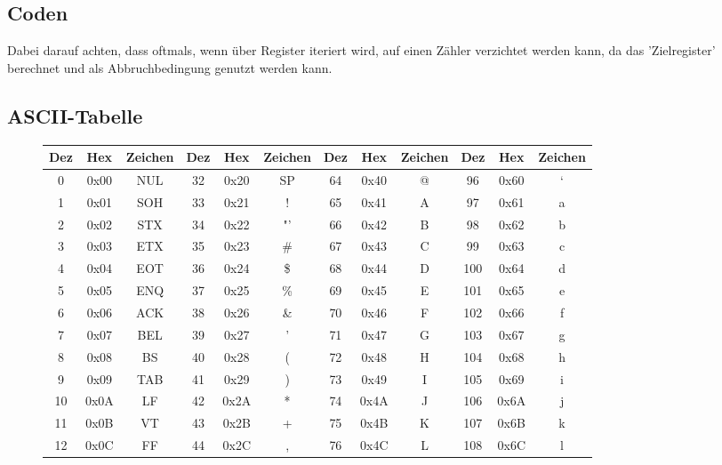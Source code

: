 \documentclass[a4paper]{article}
\begin{document}
	\subsection{Coden}
		Dabei darauf achten, dass oftmals, wenn über Register iteriert wird, auf einen Zähler verzichtet werden kann, da 
		das 'Zielregister' berechnet und als Abbruchbedingung genutzt werden kann.
	\subsection{ASCII-Tabelle}
	
	\begin{figure}[H]
	\begin{longtable}{|c|c|c||c|c|c||c|c|c||c|c|c|}
		\hline
		Dez & Hex  & Zeichen & Dez & Hex  & Zeichen & Dez  & Hex  & Zeichen & Dez & Hex  &  Zeichen   \\
		\hline
		 0  & 0x00 &   NUL   & 32  & 0x20 &   SP    &   64 & 0x40 &    @    & 96  & 0x60 &     `      \\
		 1  & 0x01 &   SOH   & 33  & 0x21 &    !    &	65 & 0x41 &    A    & 97  & 0x61 &     a      \\
		 2  & 0x02 &   STX   & 34  & 0x22 &   "'    &	66 & 0x42 &    B    & 98  & 0x62 &     b      \\
		 3  & 0x03 &   ETX   & 35  & 0x23 &   \#    &	67 & 0x43 &    C    & 99  & 0x63 &     c      \\
		 4  & 0x04 &   EOT   & 36  & 0x24 &   \$    &	68 & 0x44 &    D    & 100 & 0x64 &     d      \\
		 5  & 0x05 &   ENQ   & 37  & 0x25 &   \%    &	69 & 0x45 &    E    & 101 & 0x65 &     e      \\
		 6  & 0x06 &   ACK   & 38  & 0x26 &   \&    &	70 & 0x46 &    F    & 102 & 0x66 &     f      \\
		 7  & 0x07 &   BEL   & 39  & 0x27 &    '    &	71 & 0x47 &    G    & 103 & 0x67 &     g      \\
		 8  & 0x08 &   BS    & 40  & 0x28 &    (    &	72 & 0x48 &    H    & 104 & 0x68 &     h      \\
		 9  & 0x09 &   TAB   & 41  & 0x29 &    )    &	73 & 0x49 &    I    & 105 & 0x69 &     i      \\
		10  & 0x0A &   LF    & 42  & 0x2A &    *    &	74 & 0x4A &    J    & 106 & 0x6A &     j      \\
		11  & 0x0B &   VT    & 43  & 0x2B &    +    &	75 & 0x4B &    K    & 107 & 0x6B &     k      \\
		12  & 0x0C &   FF    & 44  & 0x2C &    ,    &	76 & 0x4C &    L    & 108 & 0x6C &     l      \\

\end{longtable}
\end{figure}
\end{document}
